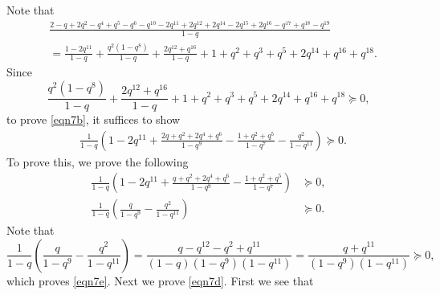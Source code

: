 \documentclass[12pt,reqno]{amsart}
\renewcommand{\(}{\left\(}
\renewcommand{\)}{\right\)}
\numberwithin{equation}{section}
\theoremstyle{plain}
\theoremstyle{definition}
\numberwithin{equation}{section}
\begin{document}
Note that
\begin{align*}
&\frac{2\!-\!q\!+\!2q^2\!-\!q^4\!+\!q^5\!-\!q^6\!-\!q^{10}\!-\!2 q^{11}\!+\!2 q^{12}\!+\!2 q^{14}\!-\!2 q^{15}\!+\!2 q^{16}\!-\!q^{17}\!+\!q^{18}\!-\!q^{19}}{1-q}\\
&=\frac{1-2q^{11}}{1-q}+\frac{q^2\left(1-q^8\right)}{1-q}+\frac{2q^{12}+q^{16}}{1-q}+1+q^2+q^3+q^5+2q^{14}+q^{16}+q^{18}.
\end{align*}
Since
\[
\frac{q^2\left(1-q^8\right)}{1-q}+\frac{2q^{12}+q^{16}}{1-q}+1+q^2+q^3+q^5+2q^{14}+q^{16}+q^{18}\succeq 0,
\]
to prove \eqref{eqn7b}, it suffices to show
\begin{align*}%
&\frac{1}{1-q} \left(1-2q^{11} +\frac{2 q + q^2 + 2 q^4+q^6}{1-q^9}-\frac{1+ q^2+q^5}{1-q^7}-\frac{q^{2}}{1-q^{11}} \right)\succeq 0.
\end{align*}
To prove this, we prove the following
\begin{align}\label{eqn7d}
\frac{1}{1-q} \left(1-2q^{11} +\frac{q + q^2 + 2 q^4+q^6}{1-q^9}-\frac{1+ q^2+q^5}{1-q^7} \right)&\succeq 0,\\\label{eqn7e}
\frac{1}{1-q} \left(\frac{q}{1-q^9}-\frac{q^{2}}{1-q^{11}} \right)&\succeq 0.
\end{align}
Note that
\[
\frac{1}{1-q}\!\left(\frac{q}{1-q^9}\!-\!\frac{q^{2}}{1-q^{11}} \right)\!=\!\frac{q\!-\!q^{12}\!-\!q^2\!+\!q^{11}}{\left(1\!-\!q\right)\left(1\!-\!q^9\right)\left(1\!-\!q^{11}\right)}\!=\!\frac{q\!+\!q^{11}}{\left(1\!-\!q^9\right)\left(1\!-\!q^{11}\right)}\succeq 0,
\]
which proves \eqref{eqn7e}. 
Next we prove \eqref{eqn7d}. First we see that 
\end{document}
